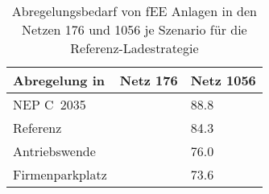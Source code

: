 {
\renewcommand{\arraystretch}{1.2}%
\begin{table}[H]
	\begin{center}
		\caption{Abregelungsbedarf von fEE Anlagen in den Netzen \num{176} und \num{1056} je Szenario für die Referenz-Ladestrategie}
		\begin{tabu} to 0.6\textwidth {X[1.5] X[1, r] X[1, r]}
			\toprule
			Abregelung in   \si{\mwh} & Netz \num{176} & Netz \num{1056} \\ \midrule
			NEP C~\num{2035}              &                & \num{88.8}      \\
			Referenz                      &                & \num{84.3}      \\
			Antriebswende                 &                & \num{76.0}      \\
			\glqq Firmenparkplatz\grqq{}  &                & \num{73.6}      \\ \bottomrule
		\end{tabu}
		\label{tab:pv_dominated_week_a_fee_cur}
	\end{center}
	\vspace{-3mm}%
\end{table}
}
